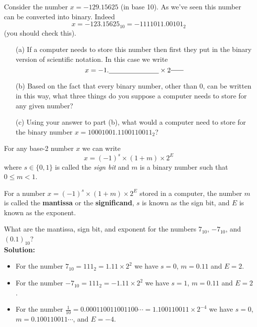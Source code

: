 \begin{problem}
    Consider the number $x = -129.15625$ (in base 10).  As we've seen this number can be
    converted into binary.  Indeed
    \[ x = -123.15625_{10} = -1111011.00101_2 \]
    (you should check this).  
    \begin{enumerate}
        \item[(a)] If a computer needs to store this number then first they put in the
            binary version of scientific notation.  In this case we write 
            \[ x = -1. \underline{\hspace{1in}} \times 2^{\underline{\hspace{0.25in}}} \]
            \solution{
                \[ -1.11101100101 \times 2^{6} \]
                }
        \item[(b)] Based on the fact that every binary number, other than 0, can be
            written in this way, what three things do you suppose a computer needs to
            store for any given number? 
        \item[(c)] Using your answer to part (b), what would a computer need to store for
            the binary number $x=10001001.1100110011_2$?
    \end{enumerate}
\end{problem}

For any base-2 number $x$ we can write
\[ x = (-1)^{s} \times (1+ m) \times 2^E \]
where $s \in \{0,1\}$ is called the {\it sign bit} and $m$ is a binary number such that $0
\le m < 1$.
\begin{definition}
    For a number $x = (-1)^{s} \times (1+m) \times 2^E$ stored in a computer, the number $m$
    is called the {\bf mantissa} or the {\bf significand}, $s$ is known as the sign bit,
    and $E$ is known as the exponent.
\end{definition}

\begin{example}
    What are the mantissa, sign bit, and exponent for the numbers $7_{10}$, $-7_{10}$,
    and $(0.1)_{10}$? \\{\bf Solution:} 
    \begin{itemize}
        \item For the number $7_{10}=111_2 = 1.11 \times 2^2$ we have $s=0$, $m=0.11$ and $E=2$.
        \item For the number $-7_{10}=111_2 = -1.11 \times 2^2$ we have $s=1$, $m=0.11$ and $E=2$.
        \item For the number $\frac{1}{10} = 0.000110011001100\cdots = 1.100110011 \times 2^{-4}$
            we have $s=0$, $m=0.100110011\cdots$, and $E = -4$.
    \end{itemize}
\end{example}

